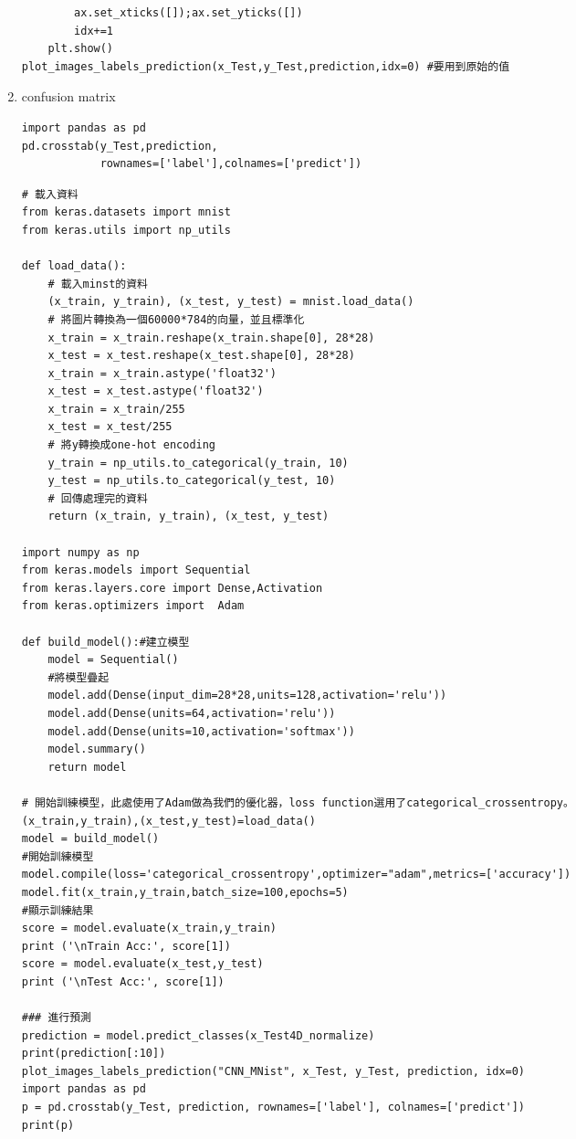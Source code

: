 \documentclass[a4paper,12pt]{article}
\begin{document}
\begin{enumerate}
\begin{lstlisting}
        ax.set_xticks([]);ax.set_yticks([])
        idx+=1
    plt.show()
plot_images_labels_prediction(x_Test,y_Test,prediction,idx=0) #要用到原始的值
\end{lstlisting}

\item confusion matrix
\label{sec:org355b86a}
\lstset{breaklines=true,language=Python,label= ,caption= ,captionpos=b,numbers=none}
\begin{lstlisting}
import pandas as pd
pd.crosstab(y_Test,prediction,
            rownames=['label'],colnames=['predict'])
\end{lstlisting}

\lstset{breaklines=true,language=Python,label= ,caption= ,captionpos=b,numbers=none}
\begin{lstlisting}
# 載入資料
from keras.datasets import mnist
from keras.utils import np_utils

def load_data():
    # 載入minst的資料
    (x_train, y_train), (x_test, y_test) = mnist.load_data()
    # 將圖片轉換為一個60000*784的向量，並且標準化
    x_train = x_train.reshape(x_train.shape[0], 28*28)
    x_test = x_test.reshape(x_test.shape[0], 28*28)
    x_train = x_train.astype('float32')
    x_test = x_test.astype('float32')
    x_train = x_train/255
    x_test = x_test/255
    # 將y轉換成one-hot encoding
    y_train = np_utils.to_categorical(y_train, 10)
    y_test = np_utils.to_categorical(y_test, 10)
    # 回傳處理完的資料
    return (x_train, y_train), (x_test, y_test)

import numpy as np
from keras.models import Sequential
from keras.layers.core import Dense,Activation
from keras.optimizers import  Adam

def build_model():#建立模型
    model = Sequential()
    #將模型疊起
    model.add(Dense(input_dim=28*28,units=128,activation='relu'))
    model.add(Dense(units=64,activation='relu'))
    model.add(Dense(units=10,activation='softmax'))
    model.summary()
    return model

# 開始訓練模型，此處使用了Adam做為我們的優化器，loss function選用了categorical_crossentropy。
(x_train,y_train),(x_test,y_test)=load_data()
model = build_model()
#開始訓練模型
model.compile(loss='categorical_crossentropy',optimizer="adam",metrics=['accuracy'])
model.fit(x_train,y_train,batch_size=100,epochs=5)
#顯示訓練結果
score = model.evaluate(x_train,y_train)
print ('\nTrain Acc:', score[1])
score = model.evaluate(x_test,y_test)
print ('\nTest Acc:', score[1])

### 進行預測
prediction = model.predict_classes(x_Test4D_normalize)
print(prediction[:10])
plot_images_labels_prediction("CNN_MNist", x_Test, y_Test, prediction, idx=0)
import pandas as pd
p = pd.crosstab(y_Test, prediction, rownames=['label'], colnames=['predict'])
print(p)


\end{lstlisting}
\end{enumerate}
\end{document}
